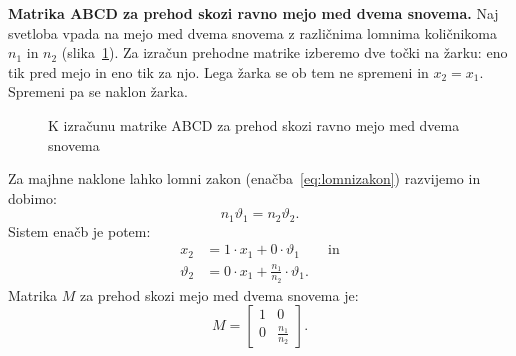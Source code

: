 \begin{example}
\label{ex:Mmeja}
{\bf Matrika ABCD za prehod skozi ravno mejo med dvema snovema.} Naj svetloba vpada na 
mejo med dvema snovema z različnima lomnima količnikoma $n_1$ in $n_2$ (slika~\ref{fig:01_ABCD2}). Za izračun 
prehodne matrike izberemo dve točki na žarku: eno tik pred mejo in eno tik za njo. 
Lega žarka se ob tem ne spremeni in $x_2 = x_1$. 
Spremeni pa se naklon žarka. 
\begin{figure}[ht]
\centering
\def\svgwidth{70truemm} 

\caption{K izračunu matrike ABCD za prehod skozi ravno mejo med dvema snovema}
\label{fig:01_ABCD2}
\end{figure}

Za majhne naklone lahko lomni zakon
(enačba~\ref{eq:lomnizakon}) razvijemo in dobimo:
\begin{equation}
n_1 \vartheta_1 = n_2 \vartheta_2.
 \label{eq:02_36}
\end{equation}
Sistem enačb je potem:
\begin{align}
 x_2 &= 1\cdot x_1 + 0\cdot \vartheta_1 \qquad \mathrm{in} \label{eq:02_37}\\
 \vartheta_2 &= 0\cdot x_1 + \frac{n_1}{n_2}\cdot \vartheta_1.
 \label{eq:02_38}
\end{align}
Matrika $M$ za prehod skozi mejo med dvema snovema je:
\begin{equation}
 M = \left[\begin{array}{cc}
1& 0\\
0&\frac{n_1}{n_2}
\end{array}\right]\!\!.
\label{eq:02_39}
\end{equation}
\end{example}

